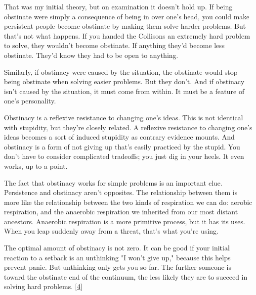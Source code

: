 That was
                  my initial theory, but on examination it doesn't hold up. If
                  being obstinate were simply a consequence of being in over
                  one's head, you could make persistent people become obstinate
                  by making them solve harder problems. But that's not what
                  happens. If you handed the Collisons an extremely hard problem
                  to solve, they wouldn't become obstinate. If anything they'd
                  become less obstinate. They'd know they had to be open to
                  anything.

Similarly, if obstinacy were caused by
                  the situation, the obstinate would stop being obstinate when
                  solving easier problems. But they don't. And if obstinacy
                  isn't caused by the situation, it must come from within. It
                  must be a feature of one's personality.

Obstinacy
                  is a reflexive resistance to changing one's ideas. This is not
                  identical with stupidity, but they're closely related. A
                  reflexive resistance to changing one's ideas becomes a sort of
                  induced stupidity as contrary evidence mounts. And obstinacy
                  is a form of not giving up that's easily practiced by the
                  stupid. You don't have to consider complicated tradeoffs; you
                  just dig in your heels. It even works, up to a point.

The
                  fact that obstinacy works for simple problems is an important
                  clue. Persistence and obstinacy aren't opposites. The
                  relationship between them is more like the relationship
                  between the two kinds of respiration we can do: aerobic
                  respiration, and the anaerobic respiration we inherited from
                  our most distant ancestors. Anaerobic respiration is a more
                  primitive process, but it has its uses. When you leap suddenly
                  away from a threat, that's what you're using.

The
                  optimal amount of obstinacy is not zero. It can be good if
                  your initial reaction to a setback is an unthinking "I won't
                  give up," because this helps prevent panic. But unthinking
                  only gets you so far. The further someone is toward the
                  obstinate end of the continuum, the less likely they are to
                  succeed in solving hard problems.
                  [\href{\#f4n}{4}]



